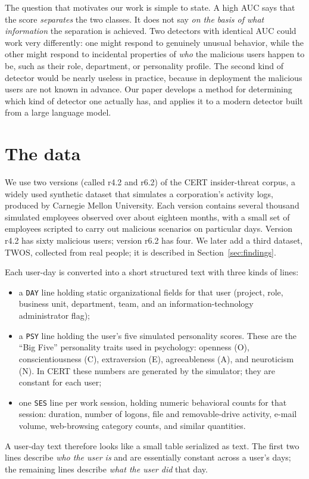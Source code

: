 \documentclass[10pt]{article}
\begin{document}
The question that motivates our work is simple to state. A high AUC says
that the score \emph{separates} the two classes. It does not say
\emph{on the basis of what information} the separation is achieved. Two
detectors with identical AUC could work very differently: one might
respond to genuinely unusual behavior, while the other might respond to
incidental properties of \emph{who} the malicious users happen to be,
such as their role, department, or personality profile. The second kind
of detector would be nearly useless in practice, because in deployment
the malicious users are not known in advance. Our paper develops a
method for determining which kind of detector one actually has, and
applies it to a modern detector built from a large language model.

\section{The data}

We use two versions (called r4.2 and r6.2) of the CERT insider-threat
corpus, a widely used synthetic dataset that simulates a corporation's
activity logs, produced by Carnegie Mellon University. Each version
contains several thousand simulated employees observed over about
eighteen months, with a small set of employees scripted to carry out
malicious scenarios on particular days. Version r4.2 has sixty malicious
users; version r6.2 has four. We later add a third dataset, TWOS,
collected from real people; it is described in
Section~\ref{sec:findings}.

Each user-day is converted into a short structured text with three kinds
of lines:
\begin{itemize}
\item a \texttt{DAY} line holding static organizational fields for that
user (project, role, business unit, department, team, and an
information-technology administrator flag);
\item a \texttt{PSY} line holding the user's five simulated personality
scores. These are the ``Big Five'' personality traits used in
psychology: openness (O), conscientiousness (C), extraversion (E),
agreeableness (A), and neuroticism (N). In CERT these numbers are
generated by the simulator; they are constant for each user;
\item one \texttt{SES} line per work session, holding numeric behavioral
counts for that session: duration, number of logons, file and
removable-drive activity, e-mail volume, web-browsing category counts,
and similar quantities.
\end{itemize}
A user-day text therefore looks like a small table serialized as text.
The first two lines describe \emph{who the user is} and are essentially
constant across a user's days; the remaining lines describe \emph{what
the user did} that day.
\end{document}
